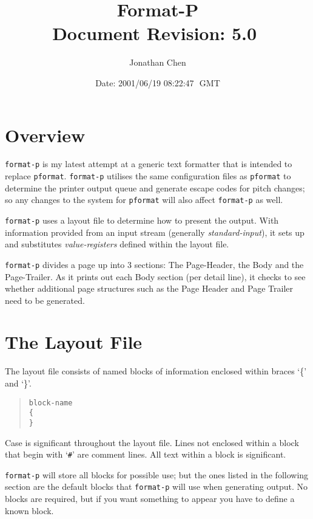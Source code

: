 \documentclass[a4paper,twoside]{article}
\title
{
	Format-P \\
	\small{Document $ $Revision: 5.0 $ $}
}
\author{Jonathan Chen}
\date
{
	\small{$ $Date: 2001/06/19 08:22:47 $ $ GMT}
}
\begin{document}
\maketitle							%

\section{Overview}

\texttt{format-p} is my latest attempt at a generic text formatter
that is intended to replace \texttt{pformat}. \texttt{format-p} utilises
the same configuration files as \texttt{pformat} to determine the printer
output queue and
generate escape codes for pitch changes; so any changes to the system
for \texttt{pformat} will also affect \texttt{format-p} as well.

\texttt{format-p} uses a layout
file to determine how to present the output. With information provided
from an input stream (generally \emph{standard-input}), it sets up and
substitutes \emph{value-registers} defined within the layout file.

\texttt{format-p} divides a page up into 3 sections: The Page-Header, the Body
and the Page-Trailer. As it prints out each Body section (per detail
line), it checks to see whether additional page structures such as the
Page Header and Page Trailer need to be generated.

\section{The Layout File}

The layout file consists of named blocks of information enclosed
within braces `\{' and `\}'.

	\begin{quote}
		\begin{alltt}
		block-name
		\{
		\}
		\end{alltt}
	\end{quote}

Case is significant throughout the layout file. Lines not enclosed within
a block that begin with `\texttt{\#}' are comment lines. All text
within a block is significant.

\texttt{format-p} will store all blocks for possible use; but the ones
listed in
the following section are the default blocks that \texttt{format-p}
will use when generating output.  No blocks are required, but if you want
something to appear you have to define a known block.
\end{document}

